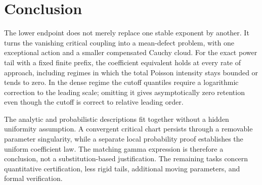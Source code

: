 \documentclass[11pt,a4paper]{article}
\numberwithin{equation}{section}
\theoremstyle{definition}
\theoremstyle{remark}
\begin{document}
\section{Conclusion}
The lower endpoint does not merely replace one stable exponent by another.
It turns the vanishing critical coupling into a mean-defect problem, with
one exceptional action and a smaller compensated Cauchy cloud. For the
exact power tail with a fixed finite prefix, the coefficient equivalent
holds at every rate of approach, including regimes in which the total
Poisson intensity stays bounded or tends to zero. In the dense regime the
cutoff quantiles require a logarithmic correction to the leading scale;
omitting it gives asymptotically zero retention even though the cutoff is
correct to relative leading order.

The analytic and probabilistic descriptions fit together without a hidden
uniformity assumption. A convergent critical chart persists through a
removable parameter singularity, while a separate local probability proof
establishes the uniform coefficient law. The matching gamma expression is
therefore a conclusion, not a substitution-based justification. The
remaining tasks concern quantitative certification, less rigid tails,
additional moving parameters, and formal verification.

\appendix
\end{document}
